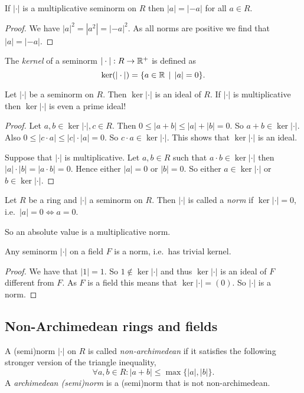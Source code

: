 \begin{lemma}
	If $|\cdot |$ is a multiplicative seminorm on $R$ then  $|a | = |-a|$ for all $a \in R$. 
\end{lemma}
\begin{proof}
	We have $|a|^2 = |a^2| = |-a|^2$. As all norms are positive we find that $|a| = |-a|$. 
\end{proof}


\begin{definition}
	The \emph{kernel} of a seminorm $|\cdot |: R \to \mathbb{R}^{+}$ is defined as \[
		\ker(|\cdot |) = \{a \in \R \st |a| = 0\} 
	.\] 
\end{definition}
\begin{remark}\label{rem:ker_norm_ideal}
	Let $ |\cdot |$ be a seminorm on $R$. Then $\ker |\cdot |$ is an ideal of $R$. If $|\cdot |$ is multiplicative then $\ker |\cdot |$ is even a prime ideal!
\end{remark}
\begin{proof}
	Let $a, b \in \ker |\cdot |, c \in R$. Then $0 \le |a + b| \le |a|+|b| = 0$. So  $a + b \in \ker |\cdot |$. 
	Also $0 \le |c \cdot a| \le |c|\cdot |a| = 0$. So $c \cdot a \in \ker |\cdot |$. 
	This shows that $\ker |\cdot  |$ is an ideal. 
	
	Suppose that $|\cdot |$ is multiplicative. 
	Let $a, b\in R $ such that $a\cdot b \in \ker |\cdot |$ then  $|a|\cdot |b| = |a\cdot b| = 0$. 
	Hence either $|a| = 0$ or  $|b|=0$. 
	So either  $a \in \ker |\cdot |$ or $b \in \ker |\cdot |$. 
\end{proof}


\begin{definition}
	Let $R$ be a ring and $|\cdot |$ a seminorm on $R$. 
	Then $|\cdot |$ is called a \emph{norm} if $\ker |\cdot | = 0$, i.e.\ $|a| = 0 \iff a = 0$. 
\end{definition}

So an absolute value is a multiplicative norm. 

\begin{lemma}
	Any seminorm $|\cdot |$ on a field $F$ is a norm, i.e.\ has trivial kernel. 
\end{lemma}
\begin{proof}
	We have that $|1| = 1$. So $1 \not\in \ker |\cdot |$ and thus $\ker |\cdot |$ is an ideal of $F$ different from $F$. 
	As $F$ is a field this means that $\ker |\cdot | = (0)$. So $|\cdot |$ is a norm. 
\end{proof}

\subsection{Non-Archimedean rings and fields} \label{sec:non-archimedean_rings_and_fields}
\begin{definition}
	A (semi)norm $|\cdot |$ on $R$ is called \emph{non-archimedean} if it satisfies the following stronger version of the triangle inequality, \[
	\forall a, b \in R: |a + b| \le \max \{|a|, |b|\} 
	.\] 
	A \emph{archimedean (semi)norm} is a (semi)norm that is not non-archimedean.
\end{definition}

